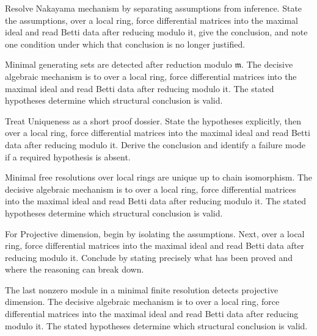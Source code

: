 \begin{problem}\label{prob:v25-problem-05}
Resolve Nakayama mechanism by separating assumptions from inference. State the assumptions, over a local ring, force differential matrices into the maximal ideal and read Betti data after reducing modulo it, give the conclusion, and note one condition under which that conclusion is no longer justified.
\end{problem}
\begin{solution}
Minimal generating sets are detected after reduction modulo $\mathfrak m$. The decisive algebraic mechanism is to over a local ring, force differential matrices into the maximal ideal and read Betti data after reducing modulo it. The stated hypotheses determine which structural conclusion is valid.
\end{solution}

\begin{problem}\label{prob:v25-problem-06}
Treat Uniqueness as a short proof dossier. State the hypotheses explicitly, then over a local ring, force differential matrices into the maximal ideal and read Betti data after reducing modulo it. Derive the conclusion and identify a failure mode if a required hypothesis is absent.
\end{problem}
\begin{solution}
Minimal free resolutions over local rings are unique up to chain isomorphism. The decisive algebraic mechanism is to over a local ring, force differential matrices into the maximal ideal and read Betti data after reducing modulo it. The stated hypotheses determine which structural conclusion is valid.
\end{solution}

\begin{problem}\label{prob:v25-problem-07}
For Projective dimension, begin by isolating the assumptions. Next, over a local ring, force differential matrices into the maximal ideal and read Betti data after reducing modulo it. Conclude by stating precisely what has been proved and where the reasoning can break down.
\end{problem}
\begin{solution}
The last nonzero module in a minimal finite resolution detects projective dimension. The decisive algebraic mechanism is to over a local ring, force differential matrices into the maximal ideal and read Betti data after reducing modulo it. The stated hypotheses determine which structural conclusion is valid.
\end{solution}

